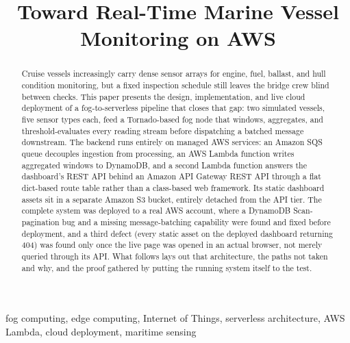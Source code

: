 \documentclass[conference]{IEEEtran}
\begin{document}
\title{Toward Real-Time Marine Vessel Monitoring on AWS}

\author{
}

\maketitle

\begin{abstract}
Cruise vessels increasingly carry dense sensor arrays for engine, fuel, ballast, and hull condition monitoring, but a fixed inspection schedule still leaves the bridge crew blind between checks. This paper presents the design, implementation, and live cloud deployment of a fog-to-serverless pipeline that closes that gap: two simulated vessels, five sensor types each, feed a Tornado-based fog node that windows, aggregates, and threshold-evaluates every reading stream before dispatching a batched message downstream. The backend runs entirely on managed AWS services: an Amazon SQS queue decouples ingestion from processing, an AWS Lambda function writes aggregated windows to DynamoDB, and a second Lambda function answers the dashboard's REST API behind an Amazon API Gateway REST API through a flat dict-based route table rather than a class-based web framework. Its static dashboard assets sit in a separate Amazon S3 bucket, entirely detached from the API tier. The complete system was deployed to a real AWS account, where a DynamoDB Scan-pagination bug and a missing message-batching capability were found and fixed before deployment, and a third defect (every static asset on the deployed dashboard returning 404) was found only once the live page was opened in an actual browser, not merely queried through its API. What follows lays out that architecture, the paths not taken and why, and the proof gathered by putting the running system itself to the test.
\end{abstract}

\begin{IEEEkeywords}
fog computing, edge computing, Internet of Things, serverless architecture, AWS Lambda, cloud deployment, maritime sensing
\end{IEEEkeywords}
\end{document}
